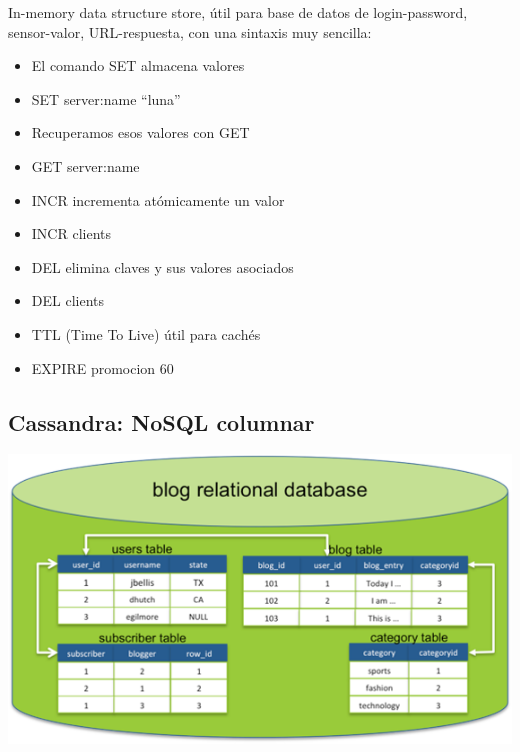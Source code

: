 \documentclass[
]{book}
\providecommand{\tightlist}{%
  \setlength{\itemsep}{0pt}\setlength{\parskip}{0pt}}
\begin{document}
In-memory data structure store, útil para base de datos de login-password, sensor-valor, URL-respuesta, con una sintaxis muy sencilla:

\begin{itemize}
\tightlist
\item
  El comando SET almacena valores
\item
  SET server:name ``luna''
\item
  Recuperamos esos valores con GET
\item
  GET server:name
\item
  INCR incrementa atómicamente un valor
\item
  INCR clients
\item
  DEL elimina claves y sus valores asociados
\item
  DEL clients
\item
  TTL (Time To Live) útil para cachés
\item
  EXPIRE promocion 60
\end{itemize}

\hypertarget{cassandra-nosql-columnar}{%
\subsection{Cassandra: NoSQL columnar}\label{cassandra-nosql-columnar}}

\includegraphics{images/BlogRDMS.png}
\end{document}
